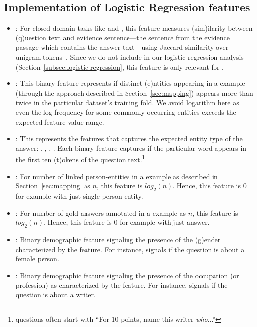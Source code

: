 \subsection{Implementation of Logistic Regression features}
\label{appendix:feature-implementation}
\begin{itemize}
  \item {}: For closed-domain \qa{} tasks like \nq{} and \squad{}, this feature measures (sim)ilarity between (q)uestion text and evidence sentence---the sentence from the evidence passage which contains the answer text---using Jaccard similarity over unigram tokens~\cite{sugawara-18}. Since we do not include \squad{} in our logistic regression analysis (Section~\ref{subsec:logistic-regression}, this feature is only relevant for \nq{}.
  
  \item {}: This binary feature represents if distinct (e)ntities appearing in a \qa{} example (through the approach described in Section~\ref{sec:mapping}) appears more than twice in the particular dataset's training fold. We avoid logarithm here as even the log frequency for some commonly occurring entities exceeds the expected feature value range.
  
  \item {}: This represents the features that captures the expected entity type of the answer: , , , . Each binary feature captures if the particular  word appears in the first ten (t)okens of the question text.\footnote{\qb{} questions often start with ``For 10 points, name this writer \textit{who}...''}
  
  \item {}: For number of linked person-entities in a example as described in Section~\ref{sec:mapping} as $n$, this feature is $log_2(n)$. Hence, this feature is 0 for example with just single person entity.
  
  \item {}: For number of gold-answers annotated in a example as $n$, this feature is $log_2(n)$. Hence, this feature is 0 for example with just answer.
  
  \item {}: Binary demographic feature signaling the presence of the (g)ender characterized by the feature. For instance,  signals if the question is about a female person.
  
  \item {}: Binary demographic feature signaling the presence of the occupation (or profession) as characterized by the feature. For instance,  signals if the question is about a writer.
\end{itemize}